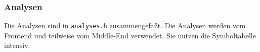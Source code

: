 \documentclass[11pt,a4paper]{article}
\begin{document}

\subsubsection{Analysen}

Die Analysen sind in \texttt{analyses.h} zusammengefaßt.  Die Analysen werden vom Frontend und teilweise vom Middle-End verwendet.
Sie nutzen die Symboltabelle intensiv.
\end{document}
